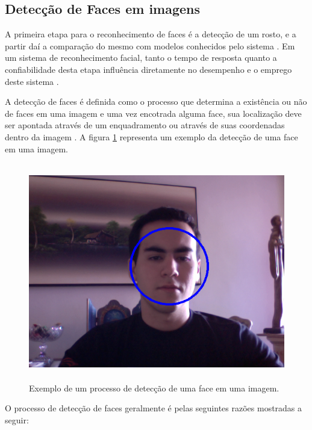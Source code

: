 \subsection{Detecção de Faces em imagens}
	
A primeira etapa para o reconhecimento de faces é a detecção de um rosto, e a partir daí a comparação do mesmo com modelos conhecidos pelo sistema \cite{hong, oliveira}. Em um sistema de reconhecimento facial, tanto o tempo de resposta quanto a confiabilidade desta etapa influência diretamente no desempenho e o emprego deste sistema \cite{oliveira}.

A detecção de faces é definida como o processo que determina a existência ou não de faces em uma imagem e uma vez encotrada alguma face, sua localização deve ser apontada através de um enquadramento ou através de suas coordenadas dentro da imagem \cite{oliveira}. A figura \ref{enquadramentoRosto} representa um exemplo da detecção de uma face em uma imagem.

	\begin{figure}[hbt]
		\begin{center}
			\includegraphics[height=9.5cm,width=12.5cm]{figuras/2.FundamentacaoTeorica/enquadramentoRosto.png}
		\end{center}
		\caption{Exemplo de um processo de detecção de uma face em uma imagem.}
		\label{enquadramentoRosto}
	\end{figure}

O processo de detecção de faces geralmente é pelas seguintes razões mostradas a seguir:


